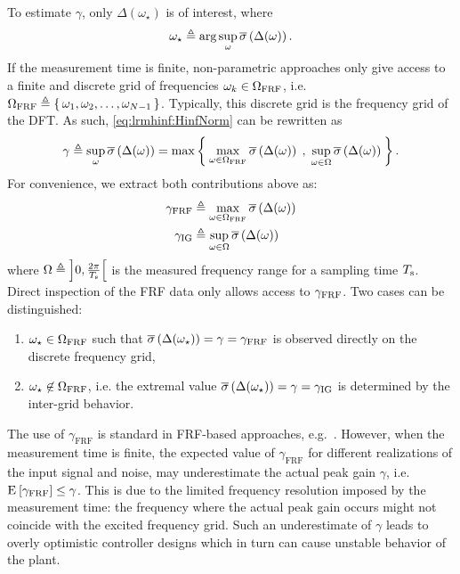 To estimate $\gamma$, only $\Delta(\omega_{\star})$ is of interest, where
\begin{equation}
 \omega_{\star} 
     \triangleq 
       \arg
         \sup_{\omega} 
            \overline{\sigma} \left( \Delta(\omega) \right) 
  \text{.}
  \label{eq:lrmhinf:omega-star}
\end{equation}
If the measurement time is finite, non-parametric approaches only give access to a finite and discrete grid of frequencies $\omega_k \in \Omega_{\mathrm{FRF}} $, i.e. $\Omega_{\mathrm{FRF}} \triangleq \set{\omega_1, \omega_2, \ldots, \omega_{N-1}}$.
Typically, this discrete grid is the frequency grid of the \gls{DFT}.
As such, \eqref{eq:lrmhinf:HinfNorm} can be rewritten as
\begin{equation}
  \gamma \triangleq 
    \sup_{\omega} 
       \overline{\sigma} \left( \Delta(\omega) \right) 
         = \max 
             \Set{
                \max_{\omega \in \ensuremath{\Omega_{\mathrm{FRF}}}} 
                  \ensuremath{ \overline{\sigma} \left( \Delta(\omega) \right) }
                \;,\;
                \sup_{\omega \in \ensuremath{\Omega}} 
                  \ensuremath{ \overline{\sigma} \left( \Delta(\omega) \right) }
                }
  \label{eq:lrmhinf:gamma-split-grid}
  \text{.}
\end{equation}
For convenience, we extract both contributions above as:
\begin{align}
  \gamma_{\mathrm{FRF}} & \triangleq 
    \max_{\omega \in \Omega_{\mathrm{FRF}}  } 
       \overline{\sigma} \left( \Delta(\omega) \right) 
  \label{eq:lrmhinf:gamma:atGrid}\\
  \gamma_{\mathrm{IG}} & \triangleq 
    \sup_{\omega \in \Omega} 
       \overline{\sigma} \left( \Delta(\omega) \right) 
   \label{eq:lrmhinf:gamma:interGrid}
\end{align}
where $\Omega \triangleq \left] 0,\frac{2\pi}{T_{\mathrm{s}}} \right[$ is the measured frequency range for a sampling time $T_{\mathrm{s}}$.
Direct inspection of the \gls{FRF} data only allows access to $\gamma_{\mathrm{FRF}}$.
Two cases can be distinguished:
\begin{enumerate}
  \item $\omega_{\star} \in \Omega_{\mathrm{FRF}}$ such that $ \overline{\sigma} \left( \Delta(\omega_{\star}) \right)  = \gamma =\gamma_{\mathrm{FRF}}$ is observed directly on the discrete frequency grid,
  \item $\omega_{\star} \not\in \Omega_{\mathrm{FRF}}$, i.e. the extremal value $ \overline{\sigma} \left( \Delta(\omega_{\star}) \right)   = \gamma = \gamma_{\mathrm{IG}}$ is determined by the inter-grid behavior.
\end{enumerate}

The use of $\gamma_{\mathrm{FRF}}$ is standard in \gls{FRF}-based approaches, e.g.~\citet{vandeWal2002}.
However, when the measurement time is finite, the expected value of  $\gamma_{\mathrm{FRF}}$  for different realizations of the input signal and noise, may underestimate the actual peak gain $\gamma$, i.e. $\operatorname{\mathrm{E}}_{} \left[ \gamma_{\mathrm{FRF}} \right] \leq \gamma$.
This is due to the limited frequency resolution imposed by the measurement time: the frequency where the actual peak gain occurs might not coincide with the excited frequency grid.
Such an underestimate of $\gamma$ leads to overly optimistic controller designs which in turn can cause unstable behavior of the plant.

